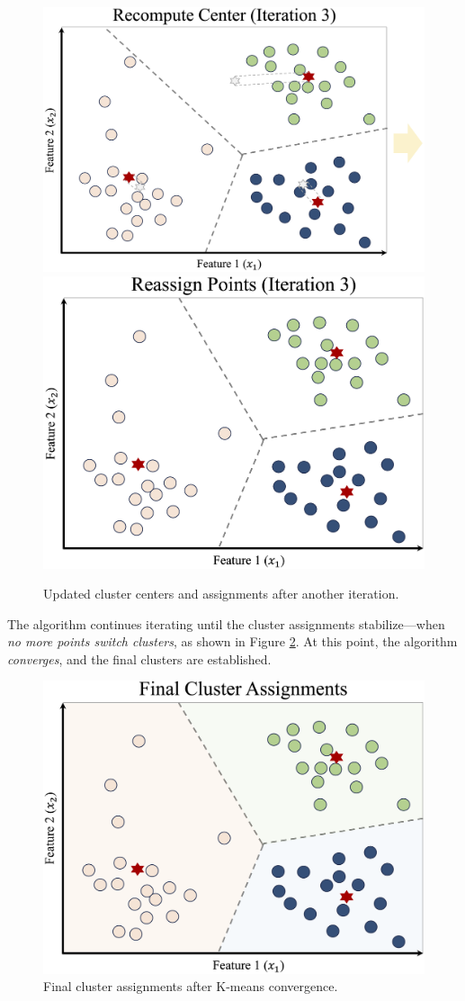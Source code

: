 \documentclass[
]{book}
\theoremstyle{definition}
\theoremstyle{definition}
\theoremstyle{definition}
\theoremstyle{definition}
\theoremstyle{remark}
\begin{document}
\begin{figure}

{\centering \includegraphics[width=0.45\linewidth]{images/ch13_cluster_ex_6} \includegraphics[width=0.45\linewidth]{images/ch13_cluster_ex_7} 

}

\caption{Updated cluster centers and assignments after another iteration.}\label{fig:cluster-ex-6}
\end{figure}

The algorithm continues iterating until the cluster assignments stabilize---when \emph{no more points switch clusters}, as shown in Figure \ref{fig:cluster-ex-8}. At this point, the algorithm \emph{converges}, and the final clusters are established.

\begin{figure}

{\centering \includegraphics[width=0.45\linewidth]{images/ch13_cluster_ex_8} 

}

\caption{Final cluster assignments after K-means convergence.}\label{fig:cluster-ex-8}
\end{figure}
\end{document}
